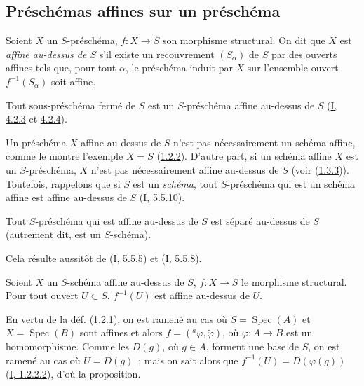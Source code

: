 \subsection{Préschémas affines sur un préschéma}
\label{subsection:II.1.2-fr}

\begin{definition}[1.2.1]
\label{II.1.2.1-fr}
Soient $X$ un $S$-préschéma, $f:X\to S$ son morphisme structural. On dit que
$X$ est \emph{affine au-dessus de $S$} s'il existe un recouvrement
$(S_\alpha)$ de $S$ par des ouverts affines tels que, pour tout $\alpha$, le
préschéma induit par $X$ sur l'ensemble ouvert $f^{-1}(S_\alpha)$ soit affine.
\end{definition}

\begin{example}[1.2.2]
\label{II.1.2.2-fr}
Tout sous-préschéma fermé de $S$ est un $S$-préschéma affine au-dessus de $S$
(\hyperref[I.4.2.3-fr]{I, 4.2.3} et
\hyperref[I.4.2.4-fr]{4.2.4}).
\end{example}

\begin{remark}[1.2.3]
\label{II.1.2.3-fr}
Un préschéma $X$ affine au-dessus de $S$ n'est pas nécessairement un schéma
affine, comme le montre l'exemple $X=S$ (\hyperref[II.1.2.2-fr]{1.2.2}).
D'autre part, si un schéma affine $X$ est un $S$-préschéma, $X$ n'est pas
nécessairement affine au-dessus
de $S$ (voir (\hyperref[II.1.3.3-fr]{1.3.3})). Toutefois, rappelons que si
$S$ est un \emph{schéma}, tout $S$-préschéma qui est un schéma affine est
affine au-dessus de $S$ (\hyperref[I.5.5.10-fr]{I, 5.5.10}).
\end{remark}

\begin{proposition}[1.2.4]
\label{II.1.2.4-fr}
Tout $S$-préschéma qui est affine au-dessus de $S$ est séparé au-dessus de
$S$ (autrement dit, est un $S$-schéma).
\end{proposition}

Cela résulte aussitôt de (\hyperref[I.5.5.5-fr]{I, 5.5.5}) et
(\hyperref[I.5.5.8-fr]{I, 5.5.8}).

\begin{proposition}[1.2.5]
\label{II.1.2.5-fr}
Soient $X$ un $S$-schéma affine au-dessus de $S$, $f:X\to S$ le morphisme
structural. Pour tout ouvert $U\subset S$, $f^{-1}(U)$ est affine au-dessus
de $U$.
\end{proposition}

En vertu de la déf. (\hyperref[II.1.2.1-fr]{1.2.1}), on est ramené au cas où
$S=\operatorname{Spec}(A)$ et $X=\operatorname{Spec}(B)$ sont affines et
alors $f=({}^a\varphi,\widetilde{\varphi})$, où $\varphi:A\to B$ est un
homomorphisme. Comme les $D(g)$, où $g\in A$, forment une base de $S$, on est
ramené au cas où $U=D(g)$~; mais on sait alors que
$f^{-1}(U)=D(\varphi(g))$ (\hyperref[I.1.2.2.2-fr]{I, 1.2.2.2}), d'où la
proposition.

